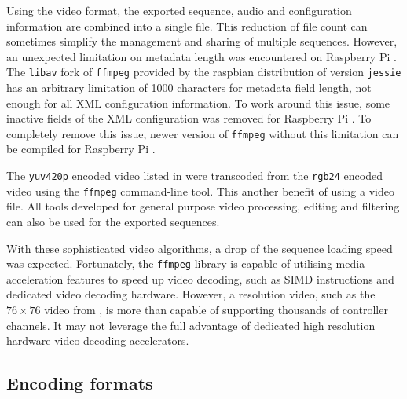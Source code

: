 Using the video format, the exported sequence, audio and configuration information are combined into a single file. This reduction of file count can sometimes simplify the management and sharing of multiple sequences. However, an unexpected limitation on metadata length was encountered on Raspberry Pi . The \texttt{libav} fork of \texttt{ffmpeg} provided by the raspbian distribution of version \texttt{jessie} has an arbitrary limitation of 1000 characters for metadata field length, not enough for all XML configuration information. To work around this issue, some inactive fields of the XML configuration was removed for Raspberry Pi . To completely remove this issue, newer version of \texttt{ffmpeg} without this limitation can be compiled for Raspberry Pi .

The \texttt{yuv420p} encoded video listed in  were transcoded from the \texttt{rgb24} encoded video using the \texttt{ffmpeg} command-line tool. This  another benefit of using a video file. All tools developed for general purpose video processing, editing and filtering can also be used for the exported sequences.

With these sophisticated video  algorithms, a drop of the sequence loading speed was expected. Fortunately, the \texttt{ffmpeg} library is capable of utilising media acceleration features to speed up video decoding, such as SIMD instructions and dedicated video decoding hardware. However, a  resolution video, such as the $76 \times 76$ video from , is more than capable of supporting thousands of controller channels. It may not leverage the full advantage of dedicated high resolution hardware video decoding accelerators.

\subsection{Encoding formats}

